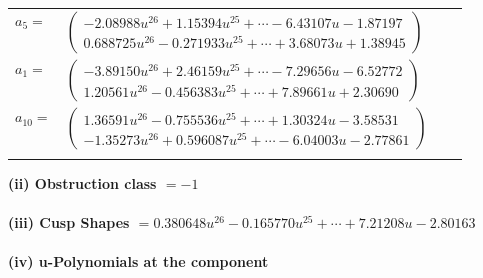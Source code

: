 \documentclass[1p]{elsarticle_modified}
\theoremstyle{definition}
\begin{document}
\begin{tabular}{m{7pt} m{180pt} m{7pt} m{180pt} }
\flushright $a_{5}=$&$\begin{pmatrix}-2.08988 u^{26}+1.15394 u^{25}+\cdots-6.43107 u-1.87197\\0.688725 u^{26}-0.271933 u^{25}+\cdots+3.68073 u+1.38945\end{pmatrix}$ \\
\flushright $a_{1}=$&$\begin{pmatrix}-3.89150 u^{26}+2.46159 u^{25}+\cdots-7.29656 u-6.52772\\1.20561 u^{26}-0.456383 u^{25}+\cdots+7.89661 u+2.30690\end{pmatrix}$ \\
\flushright $a_{10}=$&$\begin{pmatrix}1.36591 u^{26}-0.755536 u^{25}+\cdots+1.30324 u-3.58531\\-1.35273 u^{26}+0.596087 u^{25}+\cdots-6.04003 u-2.77861\end{pmatrix}$\\&\end{tabular}
\flushleft \textbf{(ii) Obstruction class $= -1$}\\~\\
\flushleft \textbf{(iii) Cusp Shapes $= 0.380648 u^{26}-0.165770 u^{25}+\cdots+7.21208 u-2.80163$}\\~\\
\newpage\renewcommand{\arraystretch}{1}
\flushleft \textbf{(iv) u-Polynomials at the component}\newline \\
\end{document}

